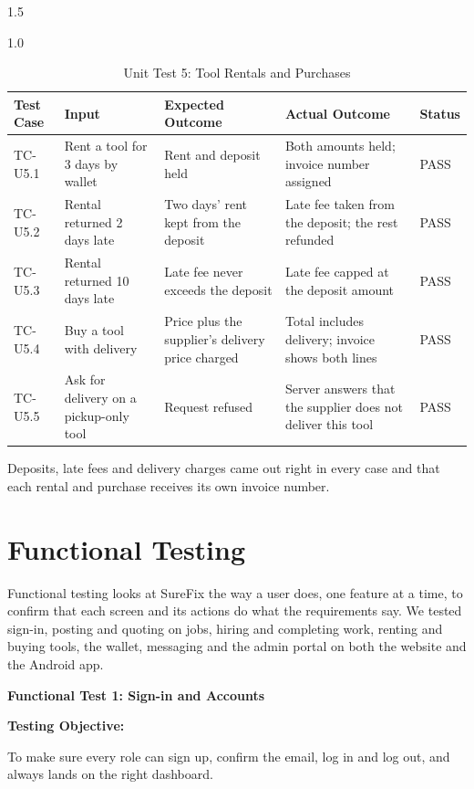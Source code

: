 \documentclass[A4paper,12pt]{report}
\theoremstyle{plain}
\theoremstyle{definition}
\theoremstyle{remark}
\numberwithin{equation}{section}
\begin{document}
\begin{spacing}{1.5}
\begin{table}[H]
\centering
\caption{Unit Test 5: Tool Rentals and Purchases}
\begin{spacing}{1.0}
{\small
\begin{tabular}{|p{}|p{}|p{}|p{}|p{}|}
\hline
\textbf{Test Case} & \textbf{Input} & \textbf{Expected Outcome} & \textbf{Actual Outcome} & \textbf{Status} \\ \hline
TC-U5.1 & Rent a tool for 3 days by wallet & Rent and deposit held & Both amounts held; invoice number assigned & PASS \\ \hline
TC-U5.2 & Rental returned 2 days late & Two days' rent kept from the deposit & Late fee taken from the deposit; the rest refunded & PASS \\ \hline
TC-U5.3 & Rental returned 10 days late & Late fee never exceeds the deposit & Late fee capped at the deposit amount & PASS \\ \hline
TC-U5.4 & Buy a tool with delivery & Price plus the supplier's delivery price charged & Total includes delivery; invoice shows both lines & PASS \\ \hline
TC-U5.5 & Ask for delivery on a pickup-only tool & Request refused & Server answers that the supplier does not deliver this tool & PASS \\ \hline
\end{tabular}}
\end{spacing}
\end{table}

Deposits, late fees and delivery charges came out right in every case and that each rental and purchase receives its own invoice number.

\section{Functional Testing}

Functional testing looks at SureFix the way a user does, one feature at a time, to confirm that each screen and its actions do what the requirements say. We tested sign-in, posting and quoting on jobs, hiring and completing work, renting and buying tools, the wallet, messaging and the admin portal on both the website and the Android app.

\textbf{Functional Test 1: Sign-in and Accounts}

\textbf{Testing Objective:}

To make sure every role can sign up, confirm the email, log in and log out, and always lands on the right dashboard.


\end{spacing}
\end{document}
